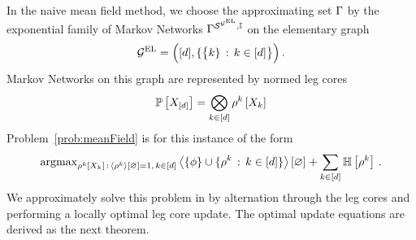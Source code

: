 
In the naive mean field method, we choose the approximating set $\Gamma$ by the exponential family of Markov Networks $\Gamma^{\mathcal{S}^{\mathcal{G}^{\mathrm{EL}}},\mathbb{I}}$ on the elementary graph %
\begin{align*}
    \mathcal{G}^{\mathrm{EL}}=\Big([d],\{\big\{k\}\, : \, k\in[d]\big\}\Big) \, .
\end{align*}
Markov Networks on this graph are represented by normed leg cores
\begin{align*}
    \mathbb{P}\left[X_{[d]}\right]
    = \bigotimes_{k\in[d]} \rho^{k}\left[X_{k}\right]
\end{align*}
Problem~\eqref{prob:meanField} is for this instance of the form
\begin{align*}
    \mathrm{argmax}_{\rho^{k}\left[X_{k}\right] \, : \, \left\langle \rho^{k}\right\rangle \left[ \varnothing \right]=1,\, k\in[d]}
    \left\langle \{\phi\} \cup \{\rho^{k} \, : \, k\in[d]\}\right\rangle \left[ \varnothing \right]
    + \sum_{k\in[d]} \mathbb{H}\left[\rho^{k}\right] \, .
\end{align*}
We approximately solve this problem in  by alternation through the leg cores and performing a locally optimal leg core update.
The optimal update equations are derived as the next theorem.

